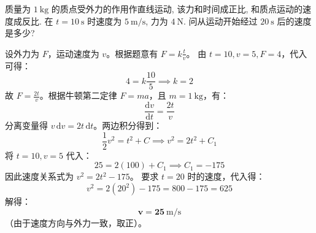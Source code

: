 \documentclass[lang=cn,11pt]{elegantbook}
\begin{document}
\begin{exercise}[实际应用题]
质量为 $1\ \mathrm{kg}$ 的质点受外力的作用作直线运动, 该力和时间成正比, 和质点运动的速度成反比. 在 $t=10\ \mathrm{s}$ 时速度为 $5\ \mathrm{m/s}$, 力为 $4\ \mathrm{N}$. 问从运动开始经过 $20\ \mathrm{s}$ 后的速度是多少?
\end{exercise}
\begin{solution}
设外力为 $F$，运动速度为 $v$。根据题意有 $F = k\frac{t}{v}$。
由 $t=10, v=5, F=4$，代入可得：
\[
4 = k\frac{10}{5} \implies k = 2
\]
故 $F = \frac{2t}{v}$。根据牛顿第二定律 $F = ma$，且 $m=1\ \mathrm{kg}$，有：
\[
\frac{\mathrm{d}v}{\mathrm{d}t} = \frac{2t}{v}
\]
分离变量得 $v\,\mathrm{d}v = 2t\,\mathrm{d}t$。两边积分得到：
\[
\frac{1}{2}v^2 = t^2 + C \implies v^2 = 2t^2 + C_1
\]
将 $t=10, v=5$ 代入：
\[
25 = 2(100) + C_1 \implies C_1 = -175
\]
因此速度关系式为 $v^2 = 2t^2 - 175$。
要求 $t=20$ 时的速度，代入得：
\[
v^2 = 2(20^2) - 175 = 800 - 175 = 625
\]
解得：
\[
\mathbf{v = 25\ \mathrm{m/s}}
\]
（由于速度方向与外力一致，取正）。
\end{solution}
\end{document}
